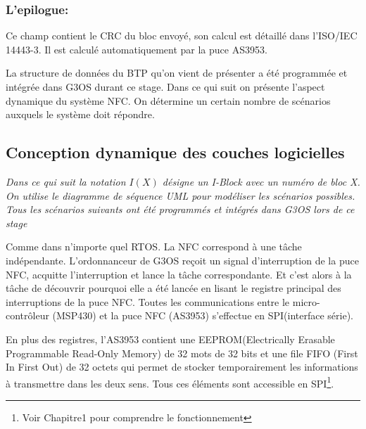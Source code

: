 \documentclass{themeensg}
\begin{document}
\subsubsection{L'epilogue:}
Ce champ contient le CRC du bloc envoyé, son calcul est détaillé dans l'ISO/IEC 14443-3. Il est calculé automatiquement par la puce AS3953.

La structure de données du BTP qu'on vient de présenter a été programmée et intégrée dans G3OS durant ce stage. Dans ce qui suit on présente l'aspect dynamique du système NFC. On détermine un certain nombre de scénarios auxquels le système doit répondre. 

\subsection{Conception dynamique des couches logicielles}
\textit{ Dans ce qui suit la notation $I(X)$ désigne un I-Block avec un numéro de bloc X. On utilise le diagramme de séquence UML pour modéliser les scénarios possibles. Tous les scénarios suivants ont été programmés et intégrés dans G3OS lors de ce stage}

Comme dans n'importe quel RTOS. La NFC correspond à une tâche indépendante. L'ordonnanceur de G3OS reçoit un signal d'interruption de la puce NFC, acquitte l'interruption et lance la tâche correspondante. Et c'est alors à la tâche de découvrir pourquoi elle a été lancée en lisant le registre principal des interruptions de la puce NFC. Toutes les communications entre le micro-contrôleur (MSP430) et la puce NFC (AS3953) s'effectue en SPI(interface série).

En plus des registres, l'AS3953 contient une EEPROM(Electrically Erasable Programmable Read-Only Memory) de 32 mots de 32 bits et une file FIFO (First In First Out) de 32 octets qui permet de stocker temporairement les informations à transmettre dans les deux sens. Tous ces éléments sont accessible en SPI\footnote{Voir Chapitre1 pour comprendre le fonctionnement}.
\end{document}
